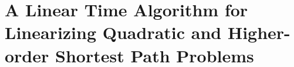 \chapter{A Linear Time Algorithm for Linearizing Quadratic and Higher-order Shortest Path Problems}










